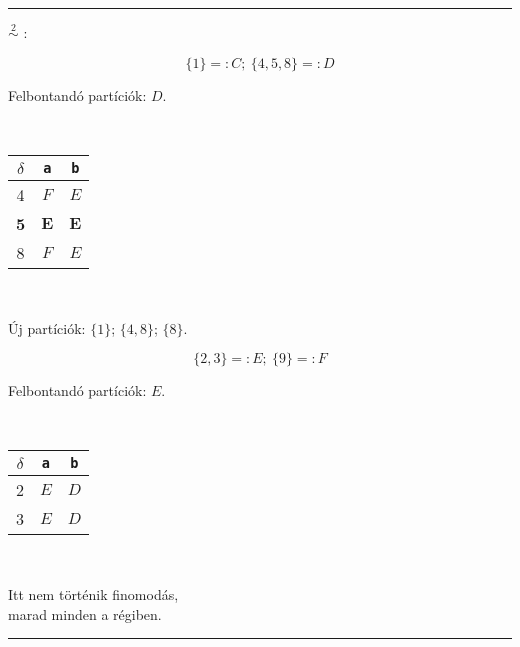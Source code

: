 \documentclass[a4paper,11pt]{article}
\newcommand{\partition}[1]{\stackrel{#1}{\sim}}
\begin{document}
\hrule
\begin{minipage}{0.1\linewidth}
	$\partition{2}$ :
\end{minipage}
\begin{minipage}{0.45\linewidth}
	\[ \{1\}=: C; ~ \{4,5,8\}=:D \]
	\begin{center}
		Felbontandó partíciók: $D$.
		
		~
		
		\begin{tabular}{c|cc}
			$\delta$ & \texttt{a} & \texttt{b} \\
			\hline
			4 & $F$ & $E$ \\
			\textbf{5} & $\textbf{E}$ & $\textbf{E}$ \\
			8 & $F$ & $E$ \\
		\end{tabular}
		
		~
		
		Új partíciók: $\{1\}$; $\{4,8\}$; $\{8\}$.
	\end{center}
\end{minipage}
\begin{minipage}{0.45\linewidth}
	\[ \{2,3\}=: E; ~ \{9\}=:F \]
	\begin{center}
		Felbontandó partíciók: $E$.
		
		~
		
		\begin{tabular}{c|cc}
			$\delta$ & \texttt{a} & \texttt{b} \\
			\hline
			2 & $E$ & $D$ \\
			3 & $E$ & $D$ \\
		\end{tabular}
		
		~
		
		Itt nem történik finomodás, \\ marad minden a régiben.
	\end{center}
\end{minipage}


\hrule
\end{document}
